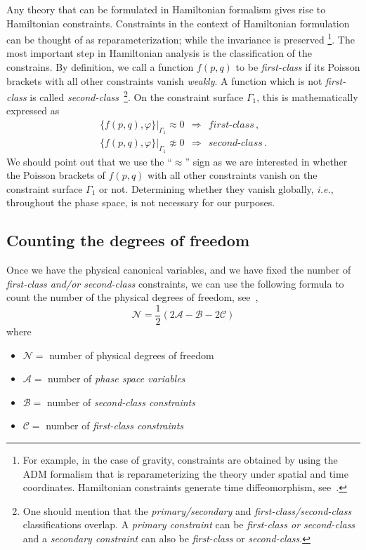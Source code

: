 \documentclass[a4paper,12pt]{article}
\newcommand{\Ga}{\Gamma}
\newcommand{\+}{^{\dagger}}
\newcommand{\2}{\frac{1}{2}}
\newcommand{\3}{\frac{1}{3}}
\newcommand{\4}{\frac{1}{4}}
\newcommand{\6}{\frac{1}{6}}
\newcommand{\8}{\frac{1}{8}}
\begin{document}
Any theory that can be formulated in Hamiltonian formalism gives rise to Hamiltonian constraints. Constraints in the context of Hamiltonian formulation can be thought of as reparameterization; while the invariance is preserved \footnote{For example, in the case of gravity, constraints are obtained by using the ADM formalism that is reparameterizing the theory under spatial and time coordinates. Hamiltonian constraints generate time diffeomorphism, see~\cite{sudarshan}.}. The most important step in Hamiltonian analysis is the classification of the constrains. By definition, we call a function $f(p,q)$ to be
{\it  first-class} if its Poisson brackets with all other constraints vanish {\it weakly}. A function which is not {\it first-class} is called
{\it second-class}~\footnote{One should mention that the {\it primary/secondary} and {\it first-class/second-class} classifications overlap. A {\it primary constraint} can be {\it first-class or second-class} and a {\it secondary constraint} can also be {\it first-class} or {\it second-class}.}. On the constraint surface $\Ga_1$, this is mathematically expressed as
\begin{eqnarray}
\left. \{f(p,q),\varphi\}\right|_{\Ga_1}\approx0 ~~\Longrightarrow~~ \textit{first-class}\,,\\
\left. \{f(p,q),\varphi\}\right|_{\Ga_1}\not\approx0 ~~\Longrightarrow~~ \textit{second-class}\,.
\end{eqnarray}
We should point out that we use the ``$\approx$'' sign as we are interested in whether the Poisson brackets of $f(p,q)$ with all other constraints vanish on the constraint surface $\Ga_1$ or not. Determining whether they vanish globally, \textit{i.e.}, throughout the phase space, is not necessary for our purposes.   



\subsection{Counting the degrees of freedom}

Once we have the physical canonical variables, and we have fixed the number of {\it first-class and/or second-class} constraints, we can use the following formula to count the number of the physical degrees of freedom, see~\cite{Henneaux}, 
\begin{equation}\label{dofcount}
\boxed{\mathcal{N}=\frac{1}{2}(2\mathcal{A}-\mathcal{B}-2\mathcal{C})}
\end{equation}
 where
 \begin{itemize}
 \item{$\mathcal{N}=$ number of physical degrees of freedom}
 \item{ $\mathcal{A}=$  number of \textit{{phase space variables}}} 
 \item{$\mathcal{B}=$  number of \textit{{second-class constraints}}} 
 \item{$\mathcal{C}=$  number
of \textit{{first-class constraints}}}
\end{itemize}
 
\end{document}
